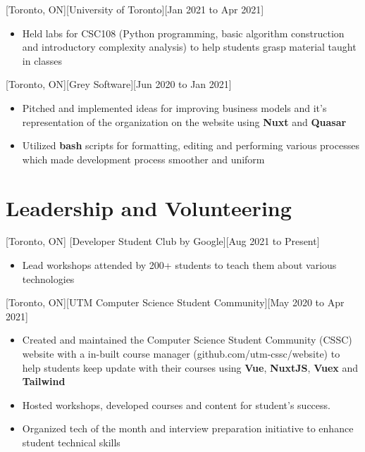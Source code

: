 \documentclass{article}
\begin{document}
[Toronto, ON][University of Toronto][Jan 2021 to Apr 2021]

 \begin{itemize}
    \item Held labs for CSC108 (Python programming, basic algorithm construction and introductory complexity analysis) to help students grasp material taught in classes
 \end{itemize}
 
[Toronto, ON][Grey Software][Jun 2020 to Jan 2021]

 \begin{itemize}
    \item Pitched and implemented ideas for improving business models and it's representation of the organization on the website using \textbf{Nuxt} and \textbf{Quasar}
    \item Utilized \textbf{bash} scripts for formatting, editing and performing various processes which made development process smoother and uniform
 \end{itemize}
 
 
 
\section{Leadership and Volunteering}
[Toronto, ON]
[Developer Student Club by Google][Aug 2021 to Present]
 \begin{itemize}
     \item Lead workshops attended by 200+ students to teach them about various technologies
 \end{itemize}

[Toronto, ON][UTM Computer Science Student Community][May 2020 to Apr 2021]
 \begin{itemize}
    \item Created and maintained the Computer Science Student Community (CSSC) website with a in-built course manager (github.com/utm-cssc/website) to help students keep update with their courses using \textbf{Vue}, \textbf{NuxtJS}, \textbf{Vuex} and \textbf{Tailwind}
    \item Hosted workshops, developed courses and content for student’s success.
    \item Organized tech of the month and interview preparation initiative to enhance student technical skills
 \end{itemize}
 
\end{document}
